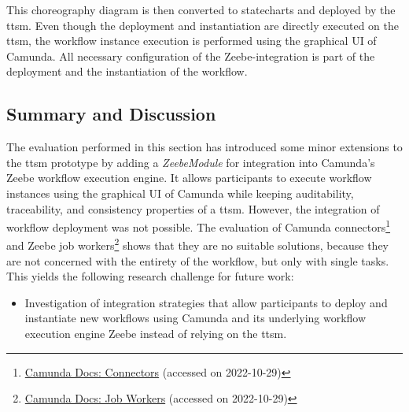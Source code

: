 This choreography diagram is then converted to statecharts and deployed by the \gls{ttsm}. Even though the deployment and instantiation are directly executed on the \gls{ttsm}, the workflow instance execution is performed using the graphical UI of Camunda. All necessary configuration of the Zeebe-integration is part of the deployment and the instantiation of the workflow.


\subsection{Summary and Discussion}
\label{sec:evaluation:integration:summary}
The evaluation performed in this section has introduced some minor extensions to the \gls{ttsm} prototype by adding a \textit{ZeebeModule} for integration into Camunda's Zeebe workflow execution engine. It allows participants to execute workflow instances using the graphical UI of Camunda while keeping auditability, traceability, and consistency properties of a \gls{ttsm}. However, the integration of workflow deployment was not possible. The evaluation of Camunda connectors\footnote{\href{https://docs.camunda.io/docs/components/integration-framework/connectors/use-connectors/}{Camunda Docs: Connectors} (accessed on 2022-10-29)} and Zeebe job workers\footnote{\href{https://docs.camunda.io/docs/components/concepts/job-workers/}{Camunda Docs: Job Workers} (accessed on 2022-10-29)} shows that they are no suitable solutions, because they are not concerned with the entirety of the workflow, but only with single tasks. This yields the following research challenge for future work:

\begin{itemize}
    \item Investigation of integration strategies that allow participants to deploy and instantiate new workflows using Camunda and its underlying workflow execution engine Zeebe instead of relying on the \gls{ttsm}.
\end{itemize}

